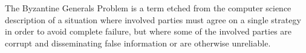 The Byzantine Generals Problem is a term etched from the computer science description of a situation where involved parties must agree on a single strategy in order to avoid complete failure, but where some of the involved parties are corrupt and disseminating false information or are otherwise unreliable.